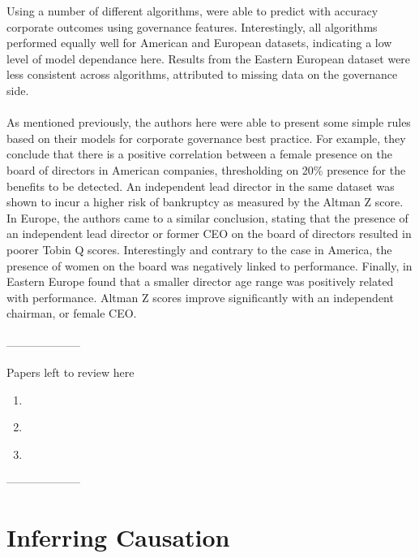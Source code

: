 {Using a number of different algorithms, \cite{moldovan2015learning} were able to predict with accuracy corporate outcomes using governance features. Interestingly, all algorithms performed equally well for American and European datasets, indicating a low level of model dependance here. Results from the Eastern European dataset were less consistent across algorithms, attributed to missing data on the governance side.\\\\
As mentioned previously, the authors here were able to present some simple rules based on their models for corporate governance best practice. For example, they conclude that there is a positive correlation between a female presence on the board of directors in American companies, thresholding on 20\% presence for the benefits to be detected. An independent lead director in the same dataset was shown to incur a higher risk of bankruptcy as measured by the Altman Z score. In Europe, the authors came to a similar conclusion, stating that the presence of an independent lead director or former CEO on the board of directors resulted in poorer Tobin Q scores. Interestingly and contrary to the case in America, the presence of women on the board was negatively linked to performance. Finally, in Eastern Europe \cite{moldovan2015learning} found that a smaller director age range was positively related with performance. Altman Z scores improve significantly with an independent chairman, or female CEO. \\\\
--------------------\\
{\color{red}
Papers left to review here
\begin{enumerate}
\item{\cite{bauer2008impact}}
\item{\cite{creamer2010learning}}
\item{\cite{chen2015does}}
\end{enumerate}}
--------------------
}
\section{Inferring Causation}
